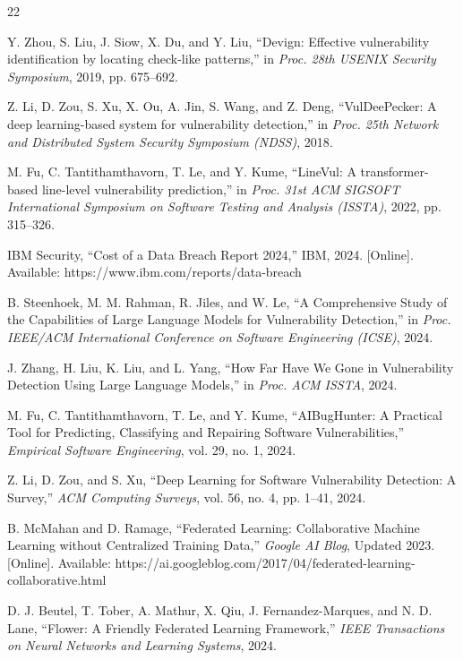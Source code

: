 \documentclass[conference]{IEEEtran}
\begin{document}
\begin{thebibliography}{22}

Y. Zhou, S. Liu, J. Siow, X. Du, and Y. Liu, ``Devign: Effective vulnerability identification by locating check-like patterns,'' in \textit{Proc. 28th USENIX Security Symposium}, 2019, pp. 675--692.

Z. Li, D. Zou, S. Xu, X. Ou, A. Jin, S. Wang, and Z. Deng, ``VulDeePecker: A deep learning-based system for vulnerability detection,'' in \textit{Proc. 25th Network and Distributed System Security Symposium (NDSS)}, 2018.

M. Fu, C. Tantithamthavorn, T. Le, and Y. Kume, ``LineVul: A transformer-based line-level vulnerability prediction,'' in \textit{Proc. 31st ACM SIGSOFT International Symposium on Software Testing and Analysis (ISSTA)}, 2022, pp. 315--326.

IBM Security, ``Cost of a Data Breach Report 2024,'' IBM, 2024. [Online]. Available: https://www.ibm.com/reports/data-breach

B. Steenhoek, M. M. Rahman, R. Jiles, and W. Le, ``A Comprehensive Study of the Capabilities of Large Language Models for Vulnerability Detection,'' in \textit{Proc. IEEE/ACM International Conference on Software Engineering (ICSE)}, 2024.

J. Zhang, H. Liu, K. Liu, and L. Yang, ``How Far Have We Gone in Vulnerability Detection Using Large Language Models,'' in \textit{Proc. ACM ISSTA}, 2024.

M. Fu, C. Tantithamthavorn, T. Le, and Y. Kume, ``AIBugHunter: A Practical Tool for Predicting, Classifying and Repairing Software Vulnerabilities,'' \textit{Empirical Software Engineering}, vol. 29, no. 1, 2024.

Z. Li, D. Zou, and S. Xu, ``Deep Learning for Software Vulnerability Detection: A Survey,'' \textit{ACM Computing Surveys}, vol. 56, no. 4, pp. 1--41, 2024.

B. McMahan and D. Ramage, ``Federated Learning: Collaborative Machine Learning without Centralized Training Data,'' \textit{Google AI Blog}, Updated 2023. [Online]. Available: https://ai.googleblog.com/2017/04/federated-learning-collaborative.html

D. J. Beutel, T. Tober, A. Mathur, X. Qiu, J. Fernandez-Marques, and N. D. Lane, ``Flower: A Friendly Federated Learning Framework,'' \textit{IEEE Transactions on Neural Networks and Learning Systems}, 2024.


\end{thebibliography}
\end{document}
